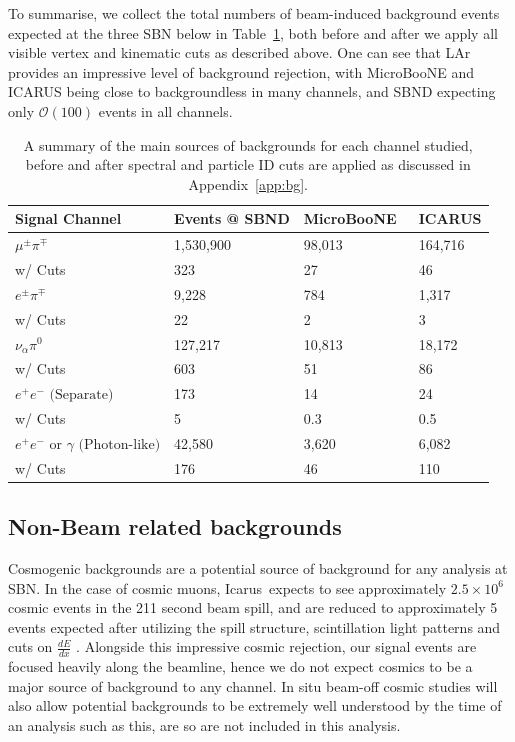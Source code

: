 \documentclass[11pt, a4paper]{article}
\newcommand{\refapp}[1]{Appendix~\ref{#1}}
\newcommand{\reftab}[1]{Table~\ref{#1}}
\def\muboone{MicroBooNE}
\def\icarus{Icarus}
\begin{document}
To summarise, we collect the total numbers of beam-induced background events
expected at the three SBN below in \reftab{tab:Rates}, both before and after we
apply all visible vertex and kinematic cuts as described above. One can see
that LAr provides an impressive level of background rejection, with \muboone
and ICARUS being close to backgroundless in many channels, and SBND expecting
only $\mathcal{O}(100)$ events in all channels.

\begin{table}[t]
\centering
\begin{tabular}{ l | l |  l | l |  }
	Signal Channel & Events @ SBND & \muboone\ & ICARUS \\
\hline\hline
$\mu^\pm \pi^\mp$ &  1,530,900  & 98,013 & 164,716\\
													  w/ Cuts &323 & 27 & 46 \\ \hline
$ e^\pm \pi^\mp$ &  9,228  & 784 & 1,317\\
													  w/ Cuts &22 & 2 & 3 \\ \hline
$ \nu_\alpha \pi^0$ &   127,217 & 10,813 & 18,172\\
													  w/ Cuts &603 & 51 & 86 \\ \hline
$ e^+e^- \text{ (Separate)} $ & 173 & 14 & 24\\
													  w/ Cuts &5 & 0.3 & 0.5\\ \hline
$ e^+ e^- \text{ or } \gamma \text{ (Photon-like)}$ &  42,580 & 3,620 & 6,082\\
													  w/ Cuts &176 & 46 & 110 \\ 
 \hline \hline

\end{tabular}

\caption{\label{tab:Rates} A summary of the main sources of backgrounds for
each channel studied, before and after spectral and particle ID cuts are
applied as discussed in \refapp{app:bg}. }

\end{table}


\subsection{Non-Beam related backgrounds}

Cosmogenic backgrounds are a potential source of background for any analysis at
SBN. In the case of cosmic muons, \icarus\ expects to see approximately $2.5
\times 10^{6}$ cosmic events in the 211 second beam spill, and are reduced to
approximately 5 events expected after utilizing the spill structure,
scintillation light patterns and cuts on $\frac{d E}{d x}$
\cite{Antonello:2015lea}.  Alongside this impressive cosmic rejection, our
signal events are focused heavily along the beamline, hence we do not expect
cosmics to be a major source of background to any channel. In situ beam-off
cosmic studies will also allow potential backgrounds to be extremely well
understood by the time of an analysis such as this, are so are not included in
this analysis. 
\end{document}

